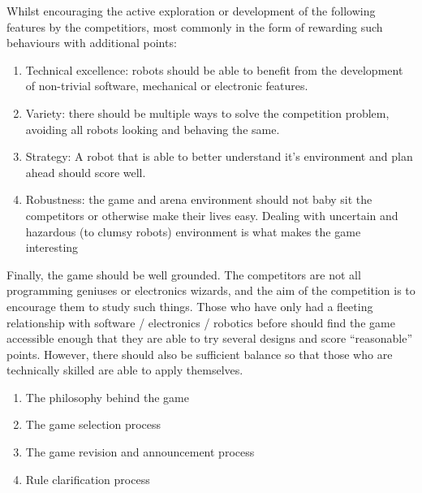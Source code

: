 Whilst encouraging the active exploration or development of the following
features by the competitiors, most commonly in the form of rewarding such
behaviours with additional points:
\begin{enumerate}
	\item Technical excellence: robots should be able to benefit from the development of non-trivial software, mechanical or electronic features.
	\item Variety: there should be multiple ways to solve the competition
		problem, avoiding all robots looking and behaving the same.
	\item Strategy: A robot that is able to better understand it's
		environment and plan ahead should score well.
	\item Robustness: the game and arena environment should not baby sit
		the competitors or otherwise make their lives easy. Dealing with
		uncertain and hazardous (to clumsy robots) environment is what
		makes the game interesting
\end{enumerate}

Finally, the game should be well grounded. The competitors are not all
programming geniuses or electronics wizards, and the aim of the competition is
to encourage them to study such things. Those who have only had a fleeting
relationship with software / electronics / robotics before should find the game
accessible enough that they are able to try several designs and score
``reasonable'' points. However, there should also be sufficient balance so that
those who are technically skilled are able to apply themselves.

\begin{enumerate}
\item The philosophy behind the game
\item The game selection process
\item The game revision and announcement process
\item Rule clarification process
\end{enumerate}

